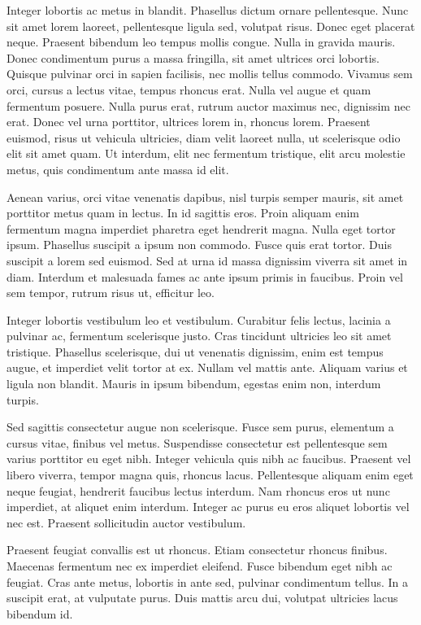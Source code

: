 Integer lobortis ac metus in blandit. Phasellus dictum ornare pellentesque. Nunc sit amet lorem laoreet, pellentesque ligula sed, volutpat risus. Donec eget placerat neque. Praesent bibendum leo tempus mollis congue. Nulla in gravida mauris. Donec condimentum purus a massa fringilla, sit amet ultrices orci lobortis. Quisque pulvinar orci in sapien facilisis, nec mollis tellus commodo. Vivamus sem orci, cursus a lectus vitae, tempus rhoncus erat. Nulla vel augue et quam fermentum posuere. Nulla purus erat, rutrum auctor maximus nec, dignissim nec erat. Donec vel urna porttitor, ultrices lorem in, rhoncus lorem. Praesent euismod, risus ut vehicula ultricies, diam velit laoreet nulla, ut scelerisque odio elit sit amet quam. Ut interdum, elit nec fermentum tristique, elit arcu molestie metus, quis condimentum ante massa id elit.

Aenean varius, orci vitae venenatis dapibus, nisl turpis semper mauris, sit amet porttitor metus quam in lectus. In id sagittis eros. Proin aliquam enim fermentum magna imperdiet pharetra eget hendrerit magna. Nulla eget tortor ipsum. Phasellus suscipit a ipsum non commodo. Fusce quis erat tortor. Duis suscipit a lorem sed euismod. Sed at urna id massa dignissim viverra sit amet in diam. Interdum et malesuada fames ac ante ipsum primis in faucibus. Proin vel sem tempor, rutrum risus ut, efficitur leo.

Integer lobortis vestibulum leo et vestibulum. Curabitur felis lectus, lacinia a pulvinar ac, fermentum scelerisque justo. Cras tincidunt ultricies leo sit amet tristique. Phasellus scelerisque, dui ut venenatis dignissim, enim est tempus augue, et imperdiet velit tortor at ex. Nullam vel mattis ante. Aliquam varius et ligula non blandit. Mauris in ipsum bibendum, egestas enim non, interdum turpis.

Sed sagittis consectetur augue non scelerisque. Fusce sem purus, elementum a cursus vitae, finibus vel metus. Suspendisse consectetur est pellentesque sem varius porttitor eu eget nibh. Integer vehicula quis nibh ac faucibus. Praesent vel libero viverra, tempor magna quis, rhoncus lacus. Pellentesque aliquam enim eget neque feugiat, hendrerit faucibus lectus interdum. Nam rhoncus eros ut nunc imperdiet, at aliquet enim interdum. Integer ac purus eu eros aliquet lobortis vel nec est. Praesent sollicitudin auctor vestibulum.

Praesent feugiat convallis est ut rhoncus. Etiam consectetur rhoncus finibus. Maecenas fermentum nec ex imperdiet eleifend. Fusce bibendum eget nibh ac feugiat. Cras ante metus, lobortis in ante sed, pulvinar condimentum tellus. In a suscipit erat, at vulputate purus. Duis mattis arcu dui, volutpat ultricies lacus bibendum id.

